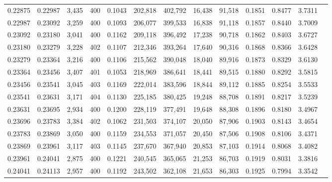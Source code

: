 \begin{tabular}{rrrrrrrrrrrrr}
0.22875 & 0.22987 &  3,435 & 400 &                                     0.1043 & 202,818 & 402,792 &  16,438 &  91,518 & 0.1851 & 0.8477 & 3.7311 \\
0.22987 & 0.23092 &  3,259 & 400 &                                     0.1093 & 206,077 & 399,533 &  16,838 &  91,118 & 0.1857 & 0.8440 & 3.7009 \\
0.23092 & 0.23180 &  3,041 & 400 &                                     0.1162 & 209,118 & 396,492 &  17,238 &  90,718 & 0.1862 & 0.8403 & 3.6727 \\
0.23180 & 0.23279 &  3,228 & 402 &                                     0.1107 & 212,346 & 393,264 &  17,640 &  90,316 & 0.1868 & 0.8366 & 3.6428 \\
0.23279 & 0.23364 &  3,216 & 400 &                                     0.1106 & 215,562 & 390,048 &  18,040 &  89,916 & 0.1873 & 0.8329 & 3.6130 \\
0.23364 & 0.23456 &  3,407 & 401 &                                     0.1053 & 218,969 & 386,641 &  18,441 &  89,515 & 0.1880 & 0.8292 & 3.5815 \\
0.23456 & 0.23541 &  3,045 & 403 &                                     0.1169 & 222,014 & 383,596 &  18,844 &  89,112 & 0.1885 & 0.8254 & 3.5533 \\
0.23541 & 0.23631 &  3,171 & 404 &                                     0.1130 & 225,185 & 380,425 &  19,248 &  88,708 & 0.1891 & 0.8217 & 3.5239 \\
0.23631 & 0.23695 &  2,934 & 400 &                                     0.1200 & 228,119 & 377,491 &  19,648 &  88,308 & 0.1896 & 0.8180 & 3.4967 \\
0.23696 & 0.23783 &  3,384 & 402 &                                     0.1062 & 231,503 & 374,107 &  20,050 &  87,906 & 0.1903 & 0.8143 & 3.4654 \\
0.23783 & 0.23869 &  3,050 & 400 &                                     0.1159 & 234,553 & 371,057 &  20,450 &  87,506 & 0.1908 & 0.8106 & 3.4371 \\
0.23869 & 0.23961 &  3,117 & 403 &                                     0.1145 & 237,670 & 367,940 &  20,853 &  87,103 & 0.1914 & 0.8068 & 3.4082 \\
0.23961 & 0.24041 &  2,875 & 400 &                                     0.1221 & 240,545 & 365,065 &  21,253 &  86,703 & 0.1919 & 0.8031 & 3.3816 \\
0.24041 & 0.24113 &  2,957 & 400 &                                     0.1192 & 243,502 & 362,108 &  21,653 &  86,303 & 0.1925 & 0.7994 & 3.3542 \\

\end{tabular}
